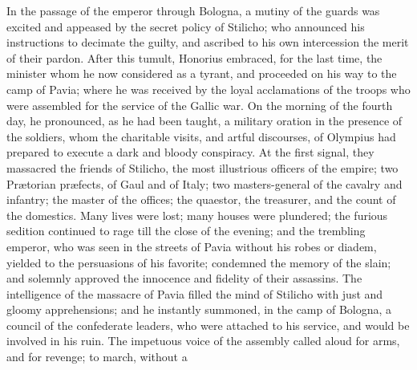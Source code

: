 

In the passage of the emperor through Bologna, a mutiny of the
guards was excited and appeased by the secret policy of Stilicho;
who announced his instructions to decimate the guilty, and
ascribed to his own intercession the merit of their pardon. After
this tumult, Honorius embraced, for the last time, the minister
whom he now considered as a tyrant, and proceeded on his way to
the camp of Pavia; where he was received by the loyal
acclamations of the troops who were assembled for the service of
the Gallic war. On the morning of the fourth day, he pronounced,
as he had been taught, a military oration in the presence of the
soldiers, whom the charitable visits, and artful discourses, of
Olympius had prepared to execute a dark and bloody conspiracy. At
the first signal, they massacred the friends of Stilicho, the
most illustrious officers of the empire; two Prætorian
præfects, of Gaul and of Italy; two masters-general of the
cavalry and infantry; the master of the offices; the quaestor,
the treasurer, and the count of the domestics. Many lives were
lost; many houses were plundered; the furious sedition continued
to rage till the close of the evening; and the trembling emperor,
who was seen in the streets of Pavia without his robes or diadem,
yielded to the persuasions of his favorite; condemned the memory
of the slain; and solemnly approved the innocence and fidelity of
their assassins. The intelligence of the massacre of Pavia filled
the mind of Stilicho with just and gloomy apprehensions; and he
instantly summoned, in the camp of Bologna, a council of the
confederate leaders, who were attached to his service, and would
be involved in his ruin. The impetuous voice of the assembly
called aloud for arms, and for revenge; to march, without a
